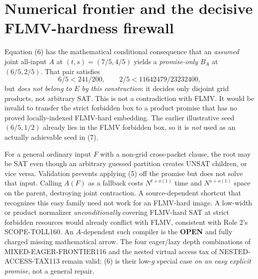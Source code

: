 \documentclass[11pt]{article}
\newcommand{\OPEN}{\textbf{OPEN}}
\begin{document}
\section{Numerical frontier and the decisive FLMV-hardness firewall}
Equation (6) has the mathematical conditional consequence that
an \emph{assumed} joint all-input \(A\) at \((t,s)=(7/5,4/5)\)
yields a \emph{promise-only} \(B_A\) at \((6/5,2/5)\).
That pair satisfies
\[
 6/5<241/200,\qquad 2/5<11642479/23232400,
\tag{7}
\]
but \emph{does not belong to \(E\) by this construction}:
it decides only disjoint grid products, not arbitrary SAT.
This is not a contradiction with FLMV. It would be
invalid to transfer the strict forbidden box to a product
promise that has no proved locally-indexed FLMV-hard
embedding. The earlier illustrative seed \((6/5,1/2)\)
already lies in the FLMV forbidden box, so it is
\emph{not} used as an actually achievable seed in (7).

For a general ordinary input \(F\) with a non-grid
cross-packet clause, the root may be SAT even though
an arbitrary guessed partition creates UNSAT children,
or vice versa. Validation prevents applying (5) off
the promise but does not solve that input. Calling
\(A(F)\) as a fallback costs \(N^{t+o(1)}\) time and
\(N^{s+o(1)}\) space on the parent, destroying
joint contraction. A source-dependent shortcut that
recognizes this easy family need not work for an
FLMV-hard image. A low-width or product normalizer
\emph{unconditionally} covering FLMV-hard SAT
at strict forbidden resources would already conflict
with FLMV, consistent with Role 2's SCOPE-TOLL160.
An \(A\)-dependent such compiler is the \OPEN{}
and fully charged missing mathematical arrow.
The four eager/lazy depth combinations of
MIXED-EAGER-FRONTIER116 and the nested virtual
access tax of NESTED-ACCESS-TAX113 remain valid;
(6) is their low-\(g\) special case \emph{on an easy
explicit promise}, not a general repair.
\end{document}
